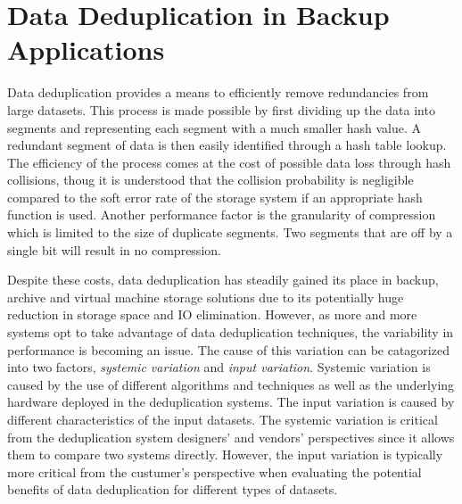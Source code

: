 \section{Data Deduplication in Backup Applications}
\label{bg_dedup}
Data deduplication provides a means to efficiently remove redundancies from large datasets. 
This process is made possible by first dividing up the data into segments and representing each segment with a much smaller hash value. 
A redundant segment of data is then easily identified through a hash table lookup. 
The efficiency of the process comes at the cost of possible data loss through hash collisions, thoug it is understood that the collision probability is negligible compared to the soft error rate of the storage system if an appropriate hash function is used\cite{Aronovich:2009:DSB:1534530.1534539, Zhu:2008:ADB:1364813.1364831, bobbarjung2006improving, Muthitacharoen:2001:LNF:502059.502052}. 
Another performance factor is the granularity of compression which is limited to the size of duplicate segments. 
Two segments that are off by a single bit will result in no compression.    

Despite these costs, data deduplication has steadily gained its place in backup\cite{Meister:2009:MCD:1534530.1534541,Lillibridge:2009:SIL:1525908.1525917,Zhu:2008:ADB:1364813.1364831}, archive\cite{you2005deep} and virtual machine storage solutions\cite{smith2008izo, Jin:2009:EDV:1534530.1534540,clements2009decentralized} due to its potentially huge reduction in storage space and IO elimination. 
However, as more and more systems opt to take advantage of data deduplication techniques, the variability in performance is becoming an issue. 
The cause of this variation can be catagorized into two factors, \emph{systemic variation} and \emph{input variation}. 
Systemic variation is caused by the use of different algorithms and techniques as well as the underlying hardware deployed in the deduplication systems. 
The input variation is caused by different characteristics of the input datasets. 
The systemic variation is critical from the deduplication system designers' and vendors' perspectives since it allows them to compare two systems directly. 
However, the input variation is typically more critical from the custumer's perspective when evaluating the potential benefits of data deduplication for different types of datasets.

